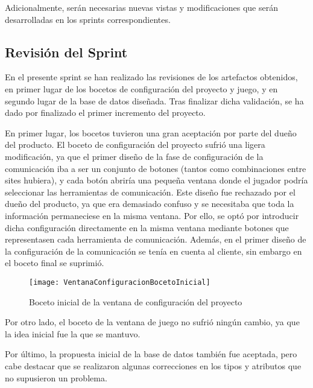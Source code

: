 

Adicionalmente, serán necesarias nuevas vistas y modificaciones que serán desarrolladas en los sprints correspondientes.

\subsection{Revisión del Sprint}
\label{sec:RevisionSprint1}

En el presente sprint se han realizado las revisiones de los artefactos obtenidos, en primer lugar de los bocetos de configuración del proyecto y juego, y en segundo lugar de la base de datos diseñada. Tras finalizar dicha validación, se ha dado por finalizado el primer incremento del proyecto.

En primer lugar, los bocetos tuvieron una gran aceptación por parte del dueño del producto. El boceto de configuración del proyecto sufrió una ligera modificación, ya que el primer diseño de la fase de configuración de la comunicación iba a ser un conjunto de botones (tantos como combinaciones entre sites hubiera), y cada botón abriría una pequeña ventana donde el jugador podría seleccionar las herramientas de comunicación. Este diseño fue rechazado por el dueño del producto, ya que era demasiado confuso y se necesitaba que toda la información permaneciese en la misma ventana. Por ello, se optó por introducir dicha configuración directamente en la misma ventana mediante botones que representasen cada herramienta de comunicación. Además, en el primer diseño de la configuración de la comunicación se tenía en cuenta al cliente, sin embargo en el boceto final se suprimió.

\begin{figure}[htb]
	\centering
	\texttt{[image: VentanaConfiguracionBocetoInicial]}
	\caption[Boceto inicial de la ventana de configuración del proyecto]{Boceto inicial de la ventana de configuración del proyecto}
	\label{fig:VentanaConfiguracionBocetoInicial}
\end{figure}

Por otro lado, el boceto de la ventana de juego no sufrió ningún cambio, ya que la idea inicial fue la que se mantuvo. 

Por último, la propuesta inicial de la base de datos también fue aceptada, pero cabe destacar que se realizaron algunas correcciones en los tipos y atributos que no supusieron un problema.

